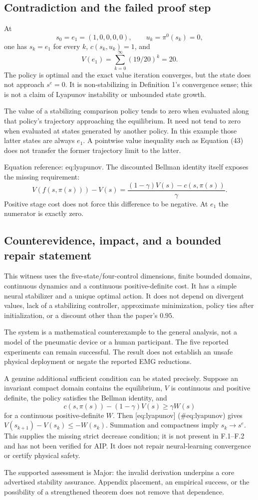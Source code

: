 \documentclass[10pt]{article}
\begin{document}
\subsection*{Contradiction and the failed proof step}
At \[s_0=e_1=(1,0,0,0,0),\qquad u_k=\pi^0(s_k)=0,\] one has \(s_k=e_1\) for every \(k\), \(c(s_k,u_k)=1\), and \[V(e_1)=\sum_{k=0}^{\infty}(19/20)^k=20.\] The policy is optimal and the exact value iteration converges, but the state does not approach \(s^e=0\). It is non-stabilizing in Definition 1’s convergence sense; this is not a claim of Lyapunov instability or unbounded state growth.\par
The value of a stabilizing comparison policy tends to zero when evaluated along that policy’s trajectory approaching the equilibrium. It need not tend to zero when evaluated at states generated by another policy. In this example those latter states are always \(e_1\). A pointwise value inequality such as Equation (43) does not transfer the former trajectory limit to the latter.\par
Equation reference: eq:lyapunov. The discounted Bellman identity itself exposes the missing requirement: \[
 V(f(s,\pi(s)))-V(s)
 =\frac{(1-\gamma)V(s)-c(s,\pi(s))}{\gamma}.\] Positive stage cost does not force this difference to be negative. At \(e_1\) the numerator is exactly zero.\par
\subsection*{Counterevidence, impact, and a bounded repair statement}
This witness uses the five-state/four-control dimensions, finite bounded domains, continuous dynamics and a continuous positive-definite cost. It has a simple neural stabilizer and a unique optimal action. It does not depend on divergent values, lack of a stabilizing controller, approximate minimization, policy ties after initialization, or a discount other than the paper’s \(0.95\).\par
The system is a mathematical counterexample to the general analysis, not a model of the pneumatic device or a human participant. The five reported experiments can remain successful. The result does not establish an unsafe physical deployment or negate the reported EMG reductions.\par
A genuine additional sufficient condition can be stated precisely. Suppose an invariant compact domain contains the equilibrium, \(V\) is continuous and positive definite, the policy satisfies the Bellman identity, and \[c(s,\pi(s))-(1-\gamma)V(s)\ge\gamma W(s)\] for a continuous positive-definite \(W\). Then [eq:lyapunov] (\#eq:lyapunov) gives \(V(s_{k+1})-V(s_k)\le-W(s_k)\). Summation and compactness imply \(s_k\to s^e\). This supplies the missing strict decrease condition; it is not present in F.1–F.2 and has not been verified for AIP. It does not repair neural-learning convergence or certify physical safety.\par
The supported assessment is Major: the invalid derivation underpins a core advertised stability assurance. Appendix placement, an empirical success, or the possibility of a strengthened theorem does not remove that dependence.\par
\end{document}
